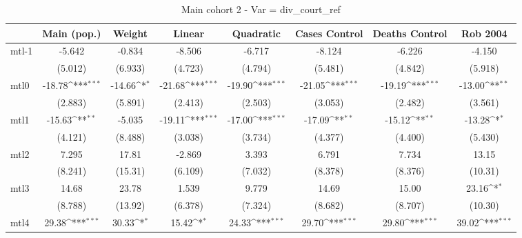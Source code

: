 \documentclass{article}
\begin{document}
{
\def\sym#1{\ifmmode^{#1}\else\(^{#1}\)\fi}
\begin{longtable}{l*{7}{c}}
\caption{Main cohort 2 - Var = div\_court\_ref}\\
\hline\hline\endfirsthead\hline\endhead\hline\endfoot\endlastfoot
                &\multicolumn{1}{c}{Main (pop.)}&\multicolumn{1}{c}{Weight}&\multicolumn{1}{c}{Linear}&\multicolumn{1}{c}{Quadratic}&\multicolumn{1}{c}{Cases Control}&\multicolumn{1}{c}{Deaths Control}&\multicolumn{1}{c}{Rob 2004}\\
\hline
mtl-1           &   -5.642         &   -0.834         &   -8.506         &   -6.717         &   -8.124         &   -6.226         &   -4.150         \\
                &  (5.012)         &  (6.933)         &  (4.723)         &  (4.794)         &  (5.481)         &  (4.842)         &  (5.918)         \\
mtl0            &   -18.78\sym{***}&   -14.66\sym{*}  &   -21.68\sym{***}&   -19.90\sym{***}&   -21.05\sym{***}&   -19.19\sym{***}&   -13.00\sym{**} \\
                &  (2.883)         &  (5.891)         &  (2.413)         &  (2.503)         &  (3.053)         &  (2.482)         &  (3.561)         \\
mtl1            &   -15.63\sym{**} &   -5.035         &   -19.11\sym{***}&   -17.00\sym{***}&   -17.09\sym{**} &   -15.12\sym{**} &   -13.28\sym{*}  \\
                &  (4.121)         &  (8.488)         &  (3.038)         &  (3.734)         &  (4.377)         &  (4.400)         &  (5.430)         \\
mtl2            &    7.295         &    17.81         &   -2.869         &    3.393         &    6.791         &    7.734         &    13.15         \\
                &  (8.241)         &  (15.31)         &  (6.109)         &  (7.032)         &  (8.378)         &  (8.376)         &  (10.31)         \\
mtl3            &    14.68         &    23.78         &    1.539         &    9.779         &    14.69         &    15.00         &    23.16\sym{*}  \\
                &  (8.788)         &  (13.92)         &  (6.378)         &  (7.324)         &  (8.682)         &  (8.707)         &  (10.30)         \\
mtl4            &    29.38\sym{***}&    30.33\sym{*}  &    15.42\sym{*}  &    24.33\sym{***}&    29.70\sym{***}&    29.80\sym{***}&    39.02\sym{***}\\

\end{longtable}}
\end{document}
